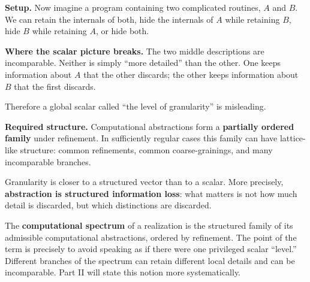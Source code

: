 \documentclass[11pt,a4paper]{article}
\newcounter{thought}
\newenvironment{thoughtbox}[1]{%
  \refstepcounter{thought}%
  \begin{tcolorbox}[
    enhanced,breakable,
    colback=white,colframe=navy,boxrule=0.85pt,
    arc=1.7mm,left=2.8mm,right=2.8mm,top=2.2mm,bottom=2.0mm,
    borderline west={2.2pt}{0pt}{blue},
    title={\large\bfseries Thought experiment \thethought: #1},
    fonttitle=\bfseries,coltitle=navy,
    attach boxed title to top left={xshift=2mm,yshift=-2mm},
    boxed title style={colback=sky,colframe=blue,boxrule=0.55pt,arc=1.2mm},
    before skip=9pt,after skip=10pt
  ]
}{\end{tcolorbox}}
\newcommand{\scene}{\medskip\textbf{Setup.} }
\begin{document}
\begin{thoughtbox}{Granularity is not a slider}
\scene Now imagine a program containing two complicated routines, $A$ and $B$. We can retain the internals of both, hide the internals of $A$ while retaining $B$, hide $B$ while retaining $A$, or hide both.

\begin{center}
\end{center}

\medskip\textbf{Where the scalar picture breaks.} The two middle descriptions are incomparable. Neither is simply ``more detailed'' than the other. One keeps information about $A$ that the other discards; the other keeps information about $B$ that the first discards.

Therefore a global scalar called ``the level of granularity'' is misleading.

\medskip\textbf{Required structure.} Computational abstractions form a \textbf{partially ordered family} under refinement. In sufficiently regular cases this family can have lattice-like structure: common refinements, common coarse-grainings, and many incomparable branches.

\begin{conceptbox}
Granularity is closer to a structured vector than to a scalar. More precisely, \textbf{abstraction is structured information loss}: what matters is not how much detail is discarded, but which distinctions are discarded.
\end{conceptbox}

\begin{definitionbox}[title={Terminology introduced here: computational spectrum}]
The \textbf{computational spectrum} of a realization is the structured family of its admissible computational abstractions, ordered by refinement. The point of the term is precisely to avoid speaking as if there were one privileged scalar ``level.'' Different branches of the spectrum can retain different local details and can be incomparable. Part II will state this notion more systematically.
\end{definitionbox}
\end{thoughtbox}
\end{document}
